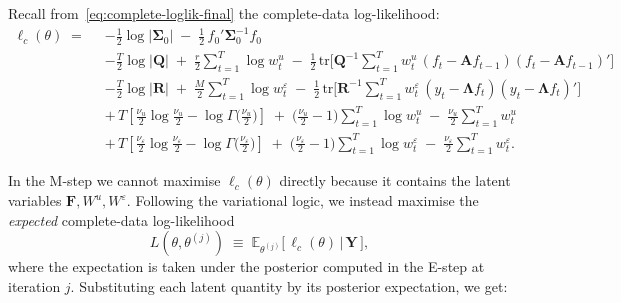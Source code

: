 \documentclass[11pt, a4paper, oneside]{article}
\newcommand{\mY}{\mathbf{Y}}
\newcommand{\mF}{\mathbf{F}}
\newcommand{\mL}{\boldsymbol{\Lambda}}
\newcommand{\mA}{\mathbf{A}}
\newcommand{\mR}{\mathbf{R}}
\newcommand{\mQ}{\mathbf{Q}}
\begin{document}
Recall from~\eqref{eq:complete-loglik-final} the complete-data
log-likelihood:
\begin{align*}
\ell_c(\theta) \;=\;\;
& -\tfrac{1}{2}\log|\boldsymbol{\Sigma}_0| \;-\; \tfrac{1}{2}\,f_0'\boldsymbol{\Sigma}_0^{-1} f_0 \\
& -\tfrac{T}{2}\log|\mQ|
  \;+\; \tfrac{r}{2}\sum_{t=1}^{T} \log w^u_t
  \;-\; \tfrac{1}{2}\,\mathrm{tr}\!\Big[\mQ^{-1}\sum_{t=1}^{T} w^u_t\,(f_t - \mA f_{t-1})(f_t - \mA f_{t-1})'\Big] \\
& -\tfrac{T}{2}\log|\mR|
  \;+\; \tfrac{M}{2}\sum_{t=1}^{T} \log w^\varepsilon_t
  \;-\; \tfrac{1}{2}\,\mathrm{tr}\!\Big[\mR^{-1}\sum_{t=1}^{T} w^\varepsilon_t\,(y_t - \mL f_t)(y_t - \mL f_t)'\Big] \\
& +\, T\!\left[\tfrac{\nu_u}{2}\log\!\tfrac{\nu_u}{2} - \log \Gamma\!\big(\tfrac{\nu_u}{2}\big)\right]
  \;+\; \big(\tfrac{\nu_u}{2} - 1\big)\sum_{t=1}^{T}\log w^u_t
  \;-\; \tfrac{\nu_u}{2}\sum_{t=1}^{T} w^u_t \\
& +\, T\!\left[\tfrac{\nu_\varepsilon}{2}\log\!\tfrac{\nu_\varepsilon}{2} - \log \Gamma\!\big(\tfrac{\nu_\varepsilon}{2}\big)\right]
  \;+\; \big(\tfrac{\nu_\varepsilon}{2} - 1\big)\sum_{t=1}^{T}\log w^\varepsilon_t
  \;-\; \tfrac{\nu_\varepsilon}{2}\sum_{t=1}^{T} w^\varepsilon_t.
\end{align*}

In the M-step we cannot maximise $\ell_c(\theta)$ directly because it
contains the latent variables $\mF, W^u, W^\varepsilon$. Following the
variational logic, we instead maximise the
\emph{expected} complete-data log-likelihood
\begin{equation}
L(\theta, \theta^{(j)}) \;\equiv\; \mathbb{E}_{\theta^{(j)}}\!\big[\,\ell_c(\theta)\,\big|\, \mY\,\big],
\label{eq:Q-function-revisited}
\end{equation}
where the expectation is taken under the posterior computed in the
E-step at iteration $j$. Substituting each latent quantity by its
posterior expectation, we get:
\end{document}
